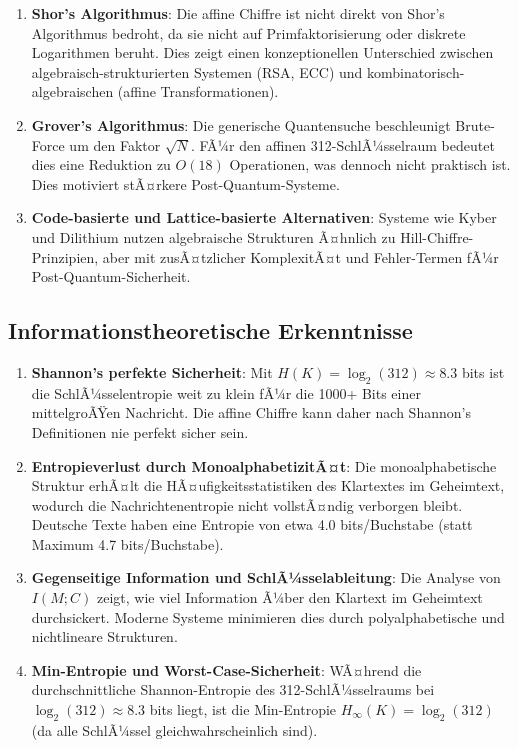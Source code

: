 ﻿\documentclass[12pt,a4paper]{article}
\begin{document}
	\begin{enumerate}
		\item \textbf{Shor's Algorithmus}: Die affine Chiffre ist nicht direkt von Shor's Algorithmus bedroht, da sie nicht auf Primfaktorisierung oder diskrete Logarithmen beruht. Dies zeigt einen konzeptionellen Unterschied zwischen algebraisch-strukturierten Systemen (RSA, ECC) und kombinatorisch-algebraischen (affine Transformationen).
		
		\item \textbf{Grover's Algorithmus}: Die generische Quantensuche beschleunigt Brute-Force um den Faktor $\sqrt{N}$. FÃ¼r den affinen 312-SchlÃ¼sselraum bedeutet dies eine Reduktion zu $O(18)$ Operationen, was dennoch nicht praktisch ist. Dies motiviert stÃ¤rkere Post-Quantum-Systeme.
		
		\item \textbf{Code-basierte und Lattice-basierte Alternativen}: Systeme wie Kyber und Dilithium nutzen algebraische Strukturen Ã¤hnlich zu Hill-Chiffre-Prinzipien, aber mit zusÃ¤tzlicher KomplexitÃ¤t und Fehler-Termen fÃ¼r Post-Quantum-Sicherheit.
	\end{enumerate}
	
	\subsection{Informationstheoretische Erkenntnisse}
	
	\begin{enumerate}
		\item \textbf{Shannon's perfekte Sicherheit}: Mit $H(K) = \log_2(312) \approx 8.3$ bits ist die SchlÃ¼sselentropie weit zu klein fÃ¼r die 1000+ Bits einer mittelgroÃŸen Nachricht. Die affine Chiffre kann daher nach Shannon's Definitionen nie perfekt sicher sein.
		
		\item \textbf{Entropieverlust durch MonoalphabetizitÃ¤t}: Die monoalphabetische Struktur erhÃ¤lt die HÃ¤ufigkeitsstatistiken des Klartextes im Geheimtext, wodurch die Nachrichtenentropie nicht vollstÃ¤ndig verborgen bleibt. Deutsche Texte haben eine Entropie von etwa 4.0 bits/Buchstabe (statt Maximum 4.7 bits/Buchstabe).
		
		\item \textbf{Gegenseitige Information und SchlÃ¼sselableitung}: Die Analyse von $I(M; C)$ zeigt, wie viel Information Ã¼ber den Klartext im Geheimtext durchsickert. Moderne Systeme minimieren dies durch polyalphabetische und nichtlineare Strukturen.
		
		\item \textbf{Min-Entropie und Worst-Case-Sicherheit}: WÃ¤hrend die durchschnittliche Shannon-Entropie des 312-SchlÃ¼sselraums bei $\log_2(312) \approx 8.3$ bits liegt, ist die Min-Entropie $H_\infty(K) = \log_2(312)$ (da alle SchlÃ¼ssel gleichwahrscheinlich sind).
	\end{enumerate}
	
\end{document}
